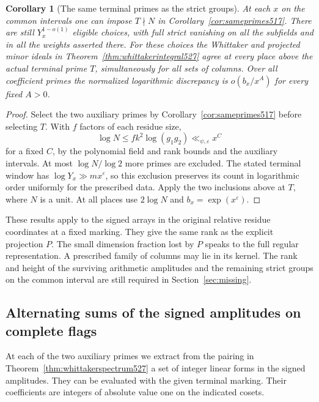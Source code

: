 \documentclass[a4paper,11pt]{article}
\newtheorem{corollary}[proposition]{Corollary}
\theoremstyle{definition}
\theoremstyle{remark}
\numberwithin{equation}{section}
\begin{document}
\begin{corollary}[The same terminal primes as the strict groups]
\leavevmode\label{cor:whittakerterminal527}
At each \(x\) on the common intervals one can impose \(T\nmid N\)
in Corollary~\ref{cor:sameprimes517}. There are still
\(Y_x^{1-o(1)}\) eligible choices, with full strict vanishing
on all the subfields and in all the weights asserted there.
For these choices the Whittaker and projected minor ideals in
Theorem~\ref{thm:whittakerintegral527} agree at every place
above the actual terminal prime \(T\), simultaneously for all
sets of columns. Over all coefficient primes the normalized
logarithmic discrepancy is \(o(b_x/x^A)\) for every fixed \(A>0\).
\end{corollary}
\begin{proof}
Select the two auxiliary primes by Corollary~\ref{cor:sameprimes517}
before selecting \(T\). With \(f\) factors of each residue size,
\[
             \log N\le f k^2\log(g_1g_2)\ll_{\psi,\varepsilon} x^C
\]
for a fixed \(C\), by the polynomial field and rank bounds and the
auxiliary intervals. At most \(\log N/\log2\) more primes are
excluded. The stated terminal window has \(\log Y_x\gg m x^\varepsilon\),
so this exclusion preserves its count in logarithmic order
uniformly for the prescribed data. Apply the two inclusions above
at \(T\), where \(N\) is a unit. At all places use \(2\log N\)
and \(b_x=\exp(x^\varepsilon)\).
\end{proof}

These results apply to the signed arrays in the original relative
residue coordinates at a fixed marking. They give the same rank
as the explicit projection \(P\). The small dimension fraction
lost by \(P\) speaks to the full regular representation.
A prescribed family of columns may lie in its kernel. The rank
and height of the surviving arithmetic amplitudes and the remaining
strict groups on the common interval are still required in
Section~\ref{sec:missing}.


\subsection{Alternating sums of the signed amplitudes on complete flags}
\label{sec:apartmentperiod528}

At each of the two auxiliary primes we extract from the pairing in
Theorem~\ref{thm:whittakerspectrum527} a set of integer linear forms
in the signed amplitudes. They can be evaluated with the given
terminal marking. Their coefficients are integers of absolute value one on the indicated cosets.
\end{document}
